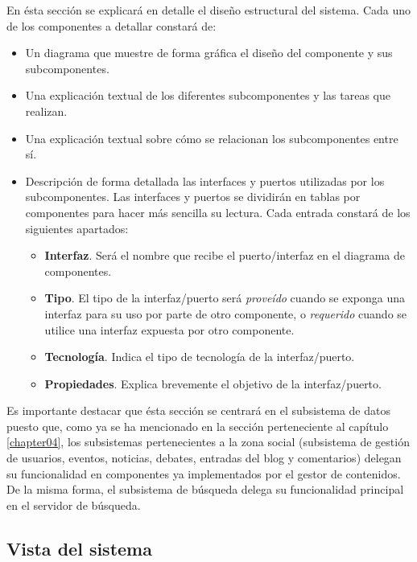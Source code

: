 En ésta sección se explicará en detalle el diseño estructural del sistema.  Cada uno de los componentes a detallar constará de:
\begin{itemize}
	\item Un diagrama que muestre de forma gráfica el diseño del componente y sus subcomponentes.
	\item Una explicación textual de los diferentes subcomponentes y las tareas que realizan.
	\item Una explicación textual sobre cómo se relacionan los subcomponentes entre sí.
	\item Descripción de forma detallada las interfaces y puertos utilizadas por los subcomponentes.  Las interfaces y puertos se dividirán en tablas por componentes para hacer más sencilla su lectura.	Cada entrada constará de los siguientes apartados:
	\begin{itemize}
		\item \textbf{Interfaz}.  Será el nombre que recibe el puerto/interfaz en el diagrama de componentes.
		\item \textbf{Tipo}.  El tipo de la interfaz/puerto será \textit{proveído} cuando se exponga una interfaz para su uso por parte de otro componente, o \textit{requerido} cuando se utilice una interfaz expuesta por otro componente.
		\item \textbf{Tecnología}.  Indica el tipo de tecnología de la interfaz/puerto.
		\item \textbf{Propiedades}.  Explica brevemente el objetivo de la interfaz/puerto.
	\end{itemize}
\end{itemize}

Es importante destacar que ésta sección se centrará en el subsistema de datos puesto que, como ya se ha mencionado en la sección  perteneciente al capítulo \ref{chapter04}, los subsistemas pertenecientes a la zona social (subsistema de gestión de usuarios, eventos, noticias, debates, entradas del blog y comentarios) delegan su funcionalidad en componentes ya implementados por el gestor de contenidos.  De la misma forma, el subsistema de búsqueda delega su funcionalidad principal en el servidor de búsqueda.

\subsection{Vista del sistema}
\label{vista_sistema}



